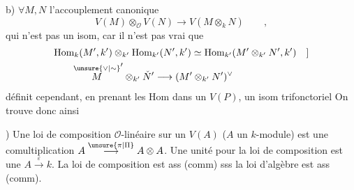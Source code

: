 b) $\forall M,N$ \deleted{\unsure{$\xi$|:}} l'accouplement canonique
\[
 V(M)\otimes_{\mathcal O}V(N)\longrightarrow V(M\otimes_k N)\qquad,
\]
\unsure{(|[}qui n'est pas un isom, car il n'est pas vrai que
\[
\begin{aligned}
 &\mathrm{Hom}_{k}(M',k')\otimes_{k'}\mathrm{Hom}_{k'}(N',k')
 \simeq\mathrm{Hom}_{k'}(M'\otimes_{k'}N',k')\quad ]\\
 &\qquad \overset{\unsure{\vee|\sim}}{M}'\otimes_{k'}\check N'\longrightarrow(M'\otimes_{k'}N')^{\vee}
\end{aligned}
\]
définit cependant, en prenant les $\mathrm{Hom}$ dans  un $V(P)$, un isom trifonctoriel
On trouve donc ainsi

\textbullet) Une loi de composition $\mathcal O$-linéaire sur un $V(A)$ ($A$ un $k$-module) est une comultiplication $A\overset{\unsure{\pi|\Pi}}{\longrightarrow}A\otimes A$.
Une unité  pour la loi de composition est une  $A\overset{\varepsilon}{\longrightarrow}k$.  La loi de composition est ass (comm) sss la loi d'algèbre est ass (comm).

